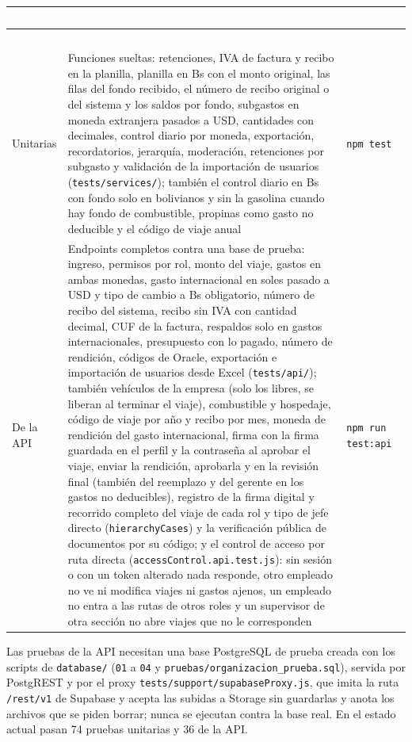 \documentclass[11pt,letterpaper]{article}
\newcommand{\cabecera}{\rowcolor{maxamPrimario}}
\newcommand{\tth}[1]{\textcolor{white}{\textbf{#1}}}
\newcommand{\code}[1]{\nolinkurl{#1}}
\begin{document}
\begin{xltabular}{\textwidth}{L{2.6cm} Y L{3.2cm}}
\cabecera \tth{Tipo} & \tth{Qué prueba} & \tth{Comando} \\
\endfirsthead
\cabecera \tth{Tipo} & \tth{Qué prueba} & \tth{Comando} \\
\endhead
{} Unitarias & Funciones sueltas: retenciones, IVA de factura y recibo en la planilla, planilla en Bs con el monto original, las filas del fondo recibido, el número de recibo original o del sistema y los saldos por fondo, subgastos en moneda extranjera pasados a USD, cantidades con decimales, control diario por moneda, exportación, recordatorios, jerarquía, moderación, retenciones por subgasto y validación de la importación de usuarios (\code{tests/services/}); también el control diario en Bs con fondo solo en bolivianos y sin la gasolina cuando hay fondo de combustible, propinas como gasto no deducible y el código de viaje anual & \code{npm test} \\
De la API & Endpoints completos contra una base de prueba: ingreso, permisos por rol, monto del viaje, gastos en ambas monedas, gasto internacional en soles pasado a USD y tipo de cambio a Bs obligatorio, número de recibo del sistema, recibo sin IVA con cantidad decimal, CUF de la factura, respaldos solo en gastos internacionales, presupuesto con lo pagado, número de rendición, códigos de Oracle, exportación e importación de usuarios desde Excel (\code{tests/api/}); también vehículos de la empresa (solo los libres, se liberan al terminar el viaje), combustible y hospedaje, código de viaje por año y recibo por mes, moneda de rendición del gasto internacional, firma con la firma guardada en el perfil y la contraseña al aprobar el viaje, enviar la rendición, aprobarla y en la revisión final (también del reemplazo y del gerente en los gastos no deducibles), registro de la firma digital y recorrido completo del viaje de cada rol y tipo de jefe directo (\code{hierarchyCases}) y la verificación pública de documentos por su código; y el control de acceso por ruta directa (\code{accessControl.api.test.js}): sin sesión o con un token alterado nada responde, otro empleado no ve ni modifica viajes ni gastos ajenos, un empleado no entra a las rutas de otros roles y un supervisor de otra sección no abre viajes que no le corresponden & \code{npm run test:api} \\
\end{xltabular}

Las pruebas de la API necesitan una base PostgreSQL de prueba creada con los scripts de \code{database/} (\code{01} a \code{04} y \code{pruebas/organizacion_prueba.sql}), servida por PostgREST y por el proxy \code{tests/support/supabaseProxy.js}, que imita la ruta \code{/rest/v1} de Supabase y acepta las subidas a Storage sin guardarlas y anota los archivos que se piden borrar; nunca se ejecutan contra la base real. En el estado actual pasan 74 pruebas unitarias y 36 de la API.
\end{document}
